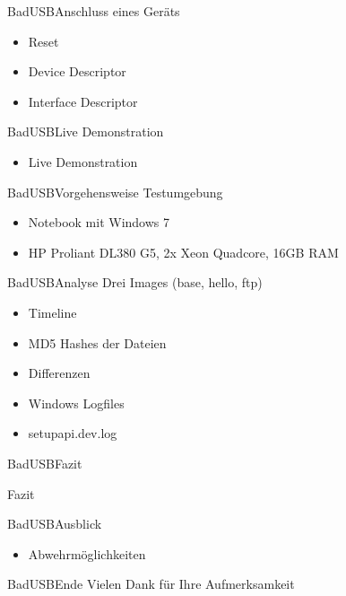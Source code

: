 \documentclass[xcolor=dvipsnames,pdftex]{beamer}
\begin{document}
\begin{frame}{BadUSB}{Anschluss eines Geräts}
	\begin{itemize}
        \item Reset
        \item Device Descriptor
        \item Interface Descriptor
	\end{itemize}
\end{frame}
\begin{frame}{BadUSB}{Live Demonstration}
	\begin{itemize}
        \item Live Demonstration
	\end{itemize}
\end{frame}
\begin{frame}{BadUSB}{Vorgehensweise}
    Testumgebung
	\begin{itemize}
        \item Notebook mit Windows 7
        \item HP Proliant DL380 G5, 2x Xeon Quadcore, 16GB RAM
	\end{itemize}
\end{frame}
\begin{frame}{BadUSB}{Analyse}
    Drei Images (base, hello, ftp)
	\begin{itemize}
        \item Timeline
        \item MD5 Hashes der Dateien 
        \item Differenzen
        \item Windows Logfiles
        \item setupapi.dev.log
	\end{itemize}
\end{frame}
\begin{frame}{BadUSB}{Fazit}
    \begin{centering}
        Fazit
    \end{centering}
\end{frame}

\begin{frame}{BadUSB}{Ausblick}
    \begin{itemize}
        \item Abwehrmöglichkeiten
    \end{itemize}
\end{frame}

\begin{frame}{BadUSB}{Ende}
    Vielen Dank für Ihre Aufmerksamkeit
\end{frame}
\end{document}
